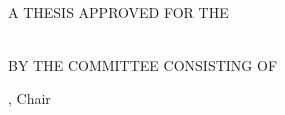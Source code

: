 \begin{center}
    \textbf{\thesistitle}\\[4em]

    A THESIS APPROVED FOR THE\\
    \academicunit\\[5em]
    
    \vspace{80px}

    BY THE COMMITTEE CONSISTING OF\\[3em]

    \vspace{80px}

    \begin{flushright}
        \chair, Chair\\
        \committeeone\\
        \committeetwo\\
    \end{flushright}
\end{center}
\newpage
